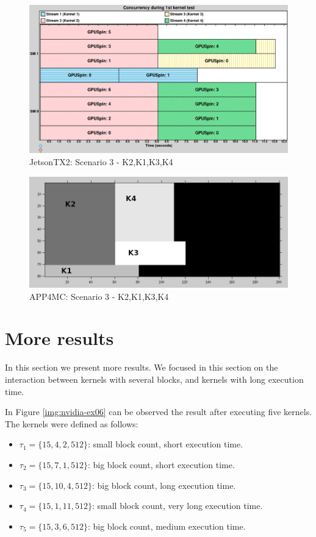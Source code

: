 \documentclass[
  12pt,
  a4paperpaper,
]{report}
\providecommand{\tightlist}{%
  \setlength{\itemsep}{0pt}\setlength{\parskip}{0pt}}
\begin{document}
\begin{figure}
\centering
\includegraphics[width=1\textwidth,height=\textheight]{source/figures/nvidia/ex05.png}
\caption{JetsonTX2: Scenario 3 - K2,K1,K3,K4 \label{img:nvidia-ex05}}
\end{figure}

\begin{figure}
\centering
\includegraphics[width=1\textwidth,height=\textheight]{source/figures/octave/ex05.png}
\caption{APP4MC: Scenario 3 - K2,K1,K3,K4 \label{img:octave-ex05}}
\end{figure}

\hypertarget{more-results}{%
\section{More results}\label{more-results}}

In this section we present more results. We focused in this section on
the interaction between kernels with several blocks, and kernels with
long execution time.

In Figure \ref{img:nvidia-ex06} can be observed the result after
executing five kernels. The kernels were defined as follows:

\begin{itemize}
\tightlist
\item
  \(\tau_1 = \{15,4,2,512\}\): small block count, short execution time.
\item
  \(\tau_2 = \{15, 7,1,512\}\): big block count, short execution time.
\item
  \(\tau_3 = \{15,10,4,512\}\): big block count, long execution time.
\item
  \(\tau_4 =\{ 15, 1,11,512\}\): small block count, very long execution
  time.
\item
  \(\tau_5 = \{15,3,6,512\}\): big block count, medium execution time.
\end{itemize}
\end{document}
